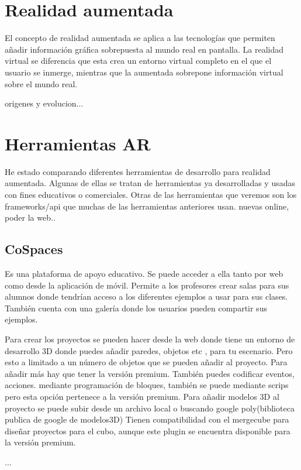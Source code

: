 

\section{Realidad aumentada}
El concepto de realidad aumentada se aplica a las tecnologías que permiten añadir información gráfica sobrepuesta al mundo real en pantalla.
La realidad virtual se diferencia que esta crea un entorno virtual completo en el que el usuario se inmerge, mientras que la aumentada sobrepone información virtual sobre el mundo real.
 
origenes y evolucion...


\section{Herramientas AR}
He estado comparando diferentes herramientas de desarrollo para realidad aumentada. Algunas de ellas se tratan de herramientas ya desarrolladas y usadas con fines educativos o comerciales. Otras de las herramientas que veremos son los frameworks/api que muchas de las herramientas anteriores usan.
nuevas online, poder la web.. 

\subsection{CoSpaces}
Es una plataforma de apoyo educativo. Se puede acceder a ella tanto por web como desde la aplicación de móvil. Permite a los profesores crear salas para sus alumnos donde tendrían acceso a los diferentes ejemplos a usar para sus clases. También cuenta con una galería donde los usuarios pueden compartir sus ejemplos.

Para crear los proyectos se pueden hacer desde la web donde tiene un entorno de desarrollo 3D donde puedes añadir paredes, objetos etc , para tu escenario. Pero esto a limitado a un número de objetos que se pueden añadir al proyecto. Para añadir más hay que tener la versión premium. También puedes codificar eventos, acciones. mediante programación de bloques, también se puede mediante scrips pero esta opción pertenece a la versión premium. Para añadir modelos 3D al proyecto se puede subir desde un archivo local o buscando google poly(biblioteca publica de google de modelos3D)
Tienen compatibilidad con el mergecube para diseñar proyectos para el cubo, aunque este plugin se encuentra disponible para la versión premium.

...

